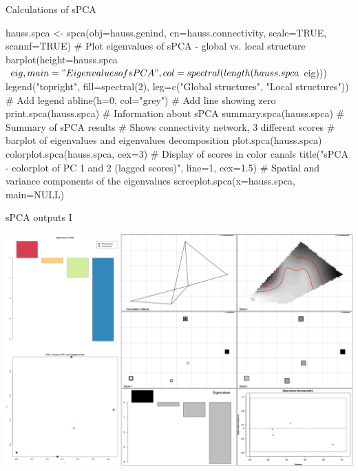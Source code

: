\documentclass[compress, ucs, xelatex, 11pt, xcolor=svgnames,
  hyperref={
    bookmarks=true,
    unicode=true,
    colorlinks=true,
    pdftitle={Molecular data in R},
    plainpages=false,
    pdfauthor={Vojtech Zeisek},
    pdfsubject={Course about phylogeny and evolution in R},
    pdfcreator={XeLaTeX},
    pdfkeywords={R, evolution, phylogeny, molecular data},
    linkcolor=Tomato,
    anchorcolor=SaddleBrown,
    citecolor=Goldenrod,
    filecolor=DarkMagenta,
    menucolor=Sienna,
    urlcolor=DarkTurquoise,
    pdftex},
  url={hyphens, lowtilde} %
  ]{beamer}
\begin{document}
\begin{frame}[fragile]{Calculations of sPCA}
  \begin{spluscode}
    hauss.spca <- spca(obj=hauss.genind, cn=hauss.connectivity,
      scale=TRUE, scannf=TRUE)
    # Plot eigenvalues of sPCA - global vs. local structure
    barplot(height=hauss.spca$eig, main="Eigenvalues of sPCA",
      col=spectral(length(hauss.spca$eig)))
    legend("topright", fill=spectral(2), leg=c("Global structures",
      "Local structures")) # Add legend
    abline(h=0, col="grey") # Add line showing zero
    print.spca(hauss.spca) # Information about sPCA
    summary.spca(hauss.spca) # Summary of sPCA results
    # Shows connectivity network, 3 different scores
    # barplot of eigenvalues and eigenvalues decomposition
    plot.spca(hauss.spca)
    colorplot.spca(hauss.spca, cex=3) # Display of scores in color canals
    title("sPCA - colorplot of PC 1 and 2 (lagged scores)", line=1, cex=1.5)
    # Spatial and variance components of the eigenvalues
    screeplot.spca(x=hauss.spca, main=NULL)
  \end{spluscode}
\end{frame}

\begin{frame}{sPCA outputs I}
  \begin{center}
    \includegraphics[width=\textwidth-1.5cm]{spca.png}
  \end{center}
\end{frame}
\end{document}
